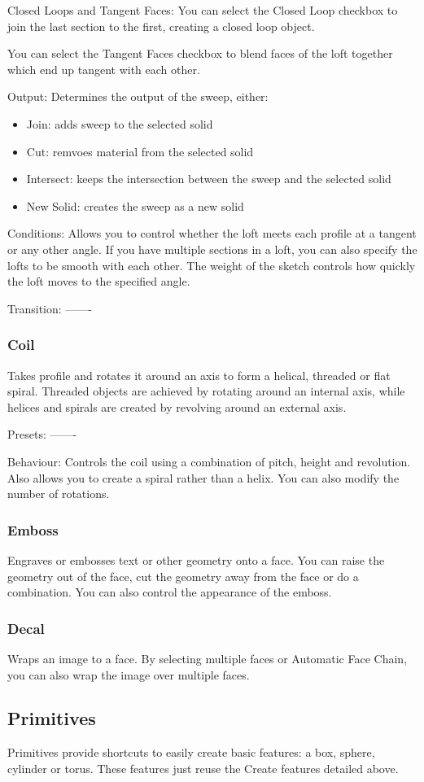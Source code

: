 Closed Loops and Tangent Faces:
You can select the Closed Loop checkbox to join the last section to the first, creating a closed loop object.

You can select the Tangent Faces checkbox to blend faces of the loft together which end up tangent with each other.

Output:
Determines the output of the sweep, either:
\begin{itemize}
    \item Join: adds sweep to the selected solid
    \item Cut: remvoes material from the selected solid
    \item Intersect: keeps the intersection between the sweep and the selected solid
    \item New Solid: creates the sweep as a new solid
\end{itemize}

Conditions:
Allows you to control whether the loft meets each profile at a tangent or any other angle. If you have multiple sections in a loft, you can also specify the lofts to be smooth with each other. The weight of the sketch controls how quickly the loft moves to the specified angle.

Transition:
-------

\subsubsection{Coil}
Takes profile and rotates it around an axis to form a helical, threaded or flat spiral. Threaded objects are achieved by rotating around an internal axis, while helices and spirals are created by revolving around an external axis.

Presets:
-------

Behaviour:
Controls the coil using a combination of pitch, height and revolution. Also allows you to create a spiral rather than a helix. You can also modify the number of rotations.

\subsubsection{Emboss}
Engraves or embosses text or other geometry onto a face. You can raise the geometry out of the face, cut the geometry away from the face or do a combination. You can also control the appearance of the emboss.

\subsubsection{Decal}
Wraps an image to a face. By selecting multiple faces or Automatic Face Chain, you can also wrap the image over multiple faces.



\subsection{Primitives}
Primitives provide shortcuts to easily create basic features: a box, sphere, cylinder or torus. These features just reuse the Create features detailed above.